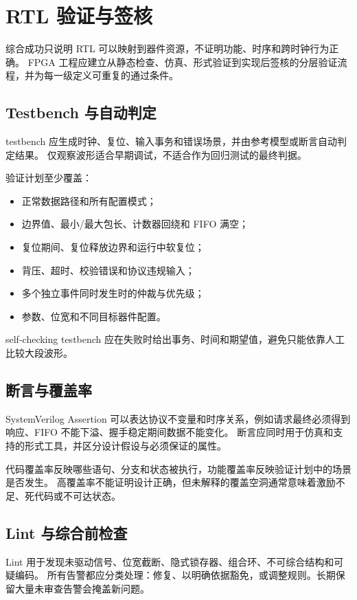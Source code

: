 \section{RTL 验证与签核}

综合成功只说明 RTL 可以映射到器件资源，不证明功能、时序和跨时钟行为正确。
FPGA 工程应建立从静态检查、仿真、形式验证到实现后签核的分层验证流程，并为每一级定义可重复的通过条件。

\subsection{Testbench 与自动判定}

testbench 应生成时钟、复位、输入事务和错误场景，并由参考模型或断言自动判定结果。
仅观察波形适合早期调试，不适合作为回归测试的最终判据。

验证计划至少覆盖：
\begin{itemize}
  \item 正常数据路径和所有配置模式；
  \item 边界值、最小/最大包长、计数器回绕和 FIFO 满空；
  \item 复位期间、复位释放边界和运行中软复位；
  \item 背压、超时、校验错误和协议违规输入；
  \item 多个独立事件同时发生时的仲裁与优先级；
  \item 参数、位宽和不同目标器件配置。
\end{itemize}

self-checking testbench 应在失败时给出事务、时间和期望值，避免只能依靠人工比较大段波形。

\subsection{断言与覆盖率}

SystemVerilog Assertion 可以表达协议不变量和时序关系，例如请求最终必须得到响应、FIFO 不能下溢、握手稳定期间数据不能变化。
断言应同时用于仿真和支持的形式工具，并区分设计假设与必须保证的属性。

代码覆盖率反映哪些语句、分支和状态被执行，功能覆盖率反映验证计划中的场景是否发生。
高覆盖率不能证明设计正确，但未解释的覆盖空洞通常意味着激励不足、死代码或不可达状态。

\subsection{Lint 与综合前检查}

Lint 用于发现未驱动信号、位宽截断、隐式锁存器、组合环、不可综合结构和可疑编码。
所有告警都应分类处理：修复、以明确依据豁免，或调整规则。长期保留大量未审查告警会掩盖新问题。


